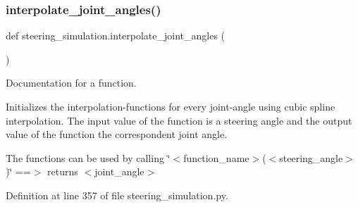 \subsubsection{\texorpdfstring{interpolate\_joint\_angles()}{interpolate\_joint\_angles()}}
{\footnotesize\ttfamily def steering\+\_\+simulation.\+interpolate\+\_\+joint\+\_\+angles (\begin{DoxyParamCaption}{ }\end{DoxyParamCaption})}



Documentation for a function. 

Initializes the interpolation-\/functions for every joint-\/angle using cubic spline interpolation. The input value of the function is a steering angle and the output value of the function the correspondent joint angle.

The functions can be used by calling \char`\"{}$<$function\+\_\+name$>$($<$steering\+\_\+angle$>$)\char`\"{} ==$>$ returns $<$joint\+\_\+angle$>$ 

Definition at line 357 of file steering\+\_\+simulation.\+py.


